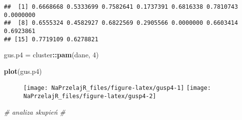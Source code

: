 \documentclass[polish,]{book}
\newenvironment{Shaded}{\begin{snugshade}}{\end{snugshade}}
\newcommand{\CommentTok}[1]{\textcolor[rgb]{0.56,0.35,0.01}{\textit{#1}}}
\newcommand{\DataTypeTok}[1]{\textcolor[rgb]{0.13,0.29,0.53}{#1}}
\newcommand{\DecValTok}[1]{\textcolor[rgb]{0.00,0.00,0.81}{#1}}
\newcommand{\KeywordTok}[1]{\textcolor[rgb]{0.13,0.29,0.53}{\textbf{#1}}}
\newcommand{\NormalTok}[1]{#1}
\newcommand{\OperatorTok}[1]{\textcolor[rgb]{0.81,0.36,0.00}{\textbf{#1}}}
\newcommand{\StringTok}[1]{\textcolor[rgb]{0.31,0.60,0.02}{#1}}
\begin{document}
\begin{Shaded}
\end{Shaded}

\begin{verbatim}
##  [1] 0.6668668 0.5333699 0.7582641 0.1737391 0.6816338 0.7810743 0.0000000
##  [8] 0.6555324 0.4582927 0.6822569 0.2905566 0.0000000 0.6603414 0.6923861
## [15] 0.7719109 0.6278821
\end{verbatim}

\begin{Shaded}
\begin{Highlighting}[]
\NormalTok{gus.p4 =}\StringTok{ }\NormalTok{cluster}\OperatorTok{::}\KeywordTok{pam}\NormalTok{(dane, }\DecValTok{4}\NormalTok{)}
\end{Highlighting}
\end{Shaded}

\begin{Shaded}
\begin{Highlighting}[]
\KeywordTok{plot}\NormalTok{(gus.p4)}
\end{Highlighting}
\end{Shaded}

\begin{figure}[h]

{\centering \texttt{[image: NaPrzelajR\_files/figure-latex/gusp4-1]} \texttt{[image: NaPrzelajR\_files/figure-latex/gusp4-2]} 

}

\end{figure}

\begin{Shaded}
\begin{Highlighting}[]
\CommentTok{# analiza skupień}
\CommentTok{#}
\end{Highlighting}
\end{Shaded}
\end{document}
